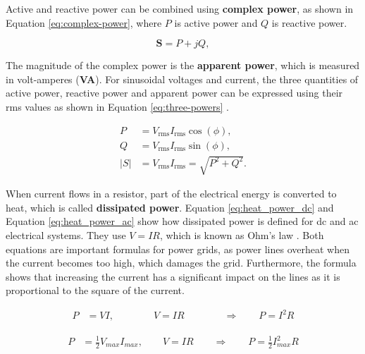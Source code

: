 Active and reactive power can be combined using \textbf{complex power}, as shown in 
Equation \eqref{eq:complex-power}, where $P$ is active power and $Q$ is reactive power.

\begin{equation}\label{eq:complex-power}
\mathbf{S} = P + jQ,
\end{equation}

The magnitude of the complex power is the \textbf{apparent power}, which is measured in volt-amperes (\textbf{VA}). For sinusoidal voltages and current, the three quantities of active power, reactive power and apparent power can be expressed using their 
\ac{rms} values as shown in Equation \eqref{eq:three-powers} \cite{power_sys_analysis,fundamentals_e_circuits}.

\begin{equation}\label{eq:three-powers}
\begin{aligned}
P &= V_{\mathrm{rms}} I_{\mathrm{rms}} \cos(\phi), \\
Q &= V_{\mathrm{rms}} I_{\mathrm{rms}} \sin(\phi), \\
|S| &= V_{\mathrm{rms}} I_{\mathrm{rms}} = \sqrt{P^2 + Q^2}.
\end{aligned}
\end{equation}

When current flows in a resistor, part of the electrical energy is converted to heat, which is called \textbf{dissipated power}. Equation \eqref{eq:heat_power_dc} and Equation \eqref{eq:heat_power_ac} show how dissipated power is defined for \ac{dc} and \ac{ac} electrical systems. They use $V = IR$, which is known as Ohm's law \cite{rl4network_operation}. Both equations are important formulas for power grids, as power lines overheat when the current becomes too high, which damages the grid. Furthermore, the formula shows that increasing the current has a significant impact on the lines as it is proportional to the square of the current. 

\begin{equation}\label{eq:heat_power_dc}
    \begin{aligned}
        P &= VI, \qquad\qquad V = IR \qquad\qquad\Rightarrow\qquad P = I^2R
    \end{aligned}
\end{equation}

\begin{equation}\label{eq:heat_power_ac}
    \begin{aligned}
        P &= \frac{1}{2}V_{max}I_{max}, \qquad V = IR \qquad\Rightarrow\qquad P = \frac{1}{2}I_{max}^2R
    \end{aligned}
\end{equation}

